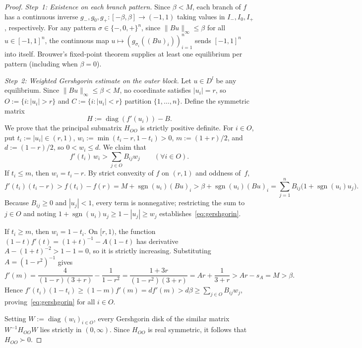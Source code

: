 \documentclass[11pt]{article}
\theoremstyle{plain}
\theoremstyle{definition}
\theoremstyle{remark}
\DeclareMathOperator{\diag}{diag}
\DeclareMathOperator{\sgn}{sgn}
\begin{document}
\begin{proof}
\emph{Step~1: Existence on each branch pattern.}
Since $\beta < M$, each branch of $f$ has a continuous inverse $g_-, g_0, g_+ : [-\beta, \beta] \to (-1, 1)$ taking values in $I_-, I_0, I_+$, respectively. For any pattern $\sigma \in \{-, 0, +\}^n$, since $\|Bu\|_\infty \le \beta$ for all $u \in [-1, 1]^n$, the continuous map $u \mapsto (g_{\sigma_i}((Bu)_i))_{i=1}^n$ sends $[-1, 1]^n$ into itself. Brouwer's fixed-point theorem supplies at least one equilibrium per pattern (including when $\beta = 0$).

\emph{Step~2: Weighted Gershgorin estimate on the outer block.}
Let $u \in D^l$ be any equilibrium. Since $\|Bu\|_\infty \le \beta < M$, no coordinate satisfies $|u_i| = r$, so $O := \{i : |u_i| > r\}$ and $C := \{i : |u_i| < r\}$ partition $\{1, \dots, n\}$. Define the symmetric matrix
\[
H := \diag(f'(u_i)) - B.
\]
We prove that the principal submatrix $H_{OO}$ is strictly positive definite. For $i \in O$, put $t_i := |u_i| \in (r, 1)$, $w_i := \min(t_i - r, 1 - t_i) > 0$, $m := (1 + r)/2$, and $d := (1 - r)/2$, so $0 < w_i \le d$. We claim that
\begin{equation}\label{eq:gershgorin}
f'(t_i)\,w_i > \sum_{j \in O} B_{ij} w_j \qquad (\forall i \in O).
\end{equation}
If $t_i \le m$, then $w_i = t_i - r$. By strict convexity of $f$ on $(r, 1)$ and oddness of~$f$,
\[
f'(t_i)(t_i - r) > f(t_i) - f(r) = M + \sgn(u_i)(Bu)_i > \beta + \sgn(u_i)(Bu)_i = \sum_{j=1}^n B_{ij}\bigl(1 + \sgn(u_i)u_j\bigr).
\]
Because $B_{ij} \ge 0$ and $|u_j| < 1$, every term is nonnegative; restricting the sum to $j \in O$ and noting $1 + \sgn(u_i)u_j \ge 1 - |u_j| \ge w_j$ establishes~\eqref{eq:gershgorin}.

If $t_i \ge m$, then $w_i = 1 - t_i$. On $[r, 1)$, the function $(1 - t)f'(t) = (1 + t)^{-1} - A(1 - t)$ has derivative $A - (1 + t)^{-2} > 1 - 1 = 0$, so it is strictly increasing. Substituting $A = (1 - r^2)^{-1}$ gives
\[
f'(m) = \frac{4}{(1 - r)(3 + r)} - \frac{1}{1 - r^2} = \frac{1 + 3r}{(1 - r^2)(3 + r)} = Ar + \frac{1}{3 + r} > Ar - s_A = M > \beta.
\]
Hence $f'(t_i)(1 - t_i) \ge (1 - m)f'(m) = d f'(m) > d\beta \ge \sum_{j \in O} B_{ij} w_j$, proving~\eqref{eq:gershgorin} for all $i \in O$.

Setting $W := \diag(w_i)_{i \in O}$, every Gershgorin disk of the similar matrix $W^{-1} H_{OO} W$ lies strictly in $(0, \infty)$. Since $H_{OO}$ is real symmetric, it follows that $H_{OO} \succ 0$.


\end{proof}
\end{document}
